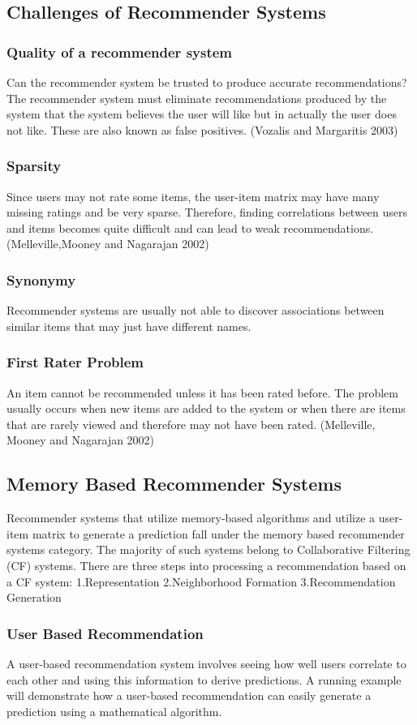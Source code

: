 \subsection{Challenges of Recommender Systems}
\subsubsection{Quality of a recommender system}
Can the recommender system be trusted to produce accurate recommendations? The recommender system must eliminate recommendations produced by the system that the system believes the user will like but in actually the user does not like. These are also known as false positives. (Vozalis and Margaritis 2003)
\subsubsection{Sparsity}
Since users may not rate some items, the user-item matrix may have many missing ratings and be very sparse. Therefore, finding correlations between users and items becomes quite difficult and can lead to weak recommendations. (Melleville,Mooney and Nagarajan 2002)
\subsubsection{Synonymy}
Recommender systems are usually not able to discover associations between similar items that may just have different names.
\subsubsection{First Rater Problem}
An item cannot be recommended unless it has been rated before. The problem usually occurs when new items are added to the system or when there are items that are rarely viewed and therefore may not have been rated. (Melleville, Mooney and Nagarajan 2002)
\subsection{Memory Based Recommender Systems}
Recommender systems that utilize memory-based algorithms and utilize a user-item matrix to generate a prediction fall under the memory based recommender systems category. The majority of such systems belong to Collaborative Filtering (CF) systems. There are three steps into processing a recommendation based on a CF system:
1.Representation
2.Neighborhood Formation
3.Recommendation Generation
\subsubsection{User Based Recommendation}
A user-based recommendation system involves seeing how well users correlate to each other and using this information to derive predictions. A running example will demonstrate how a user-based recommendation can easily generate a prediction using a mathematical algorithm.

